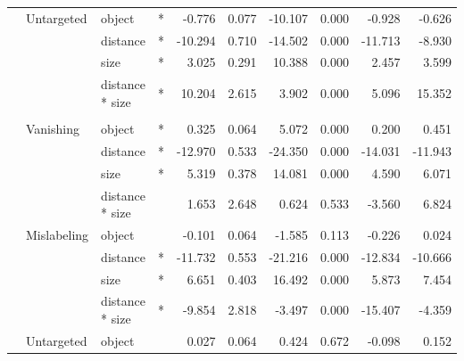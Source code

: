 \begin{longtable}[t]{llllrrrrrr}
\cmidrule{2-10}\nopagebreak
\hspace{1em} & Untargeted & object & * & -0.776 & 0.077 & -10.107 & 0.000 & -0.928 & -0.626\\
\cmidrule{3-10}\nopagebreak
\hspace{1em} &  & distance & * & -10.294 & 0.710 & -14.502 & 0.000 & -11.713 & -8.930\\
\cmidrule{3-10}\nopagebreak
\hspace{1em} &  & size & * & 3.025 & 0.291 & 10.388 & 0.000 & 2.457 & 3.599\\
\cmidrule{3-10}\nopagebreak
\hspace{1em} &  & distance * size & * & 10.204 & 2.615 & 3.902 & 0.000 & 5.096 & 15.352\\
\cmidrule{1-10}\pagebreak[0]
\addlinespace[0.3em]
\multicolumn{10}{l}{\textbf{SSD}}\\
\hspace{1em} & Vanishing & object & * & 0.325 & 0.064 & 5.072 & 0.000 & 0.200 & 0.451\\
\cmidrule{3-10}\nopagebreak
\hspace{1em} &  & distance & * & -12.970 & 0.533 & -24.350 & 0.000 & -14.031 & -11.943\\
\cmidrule{3-10}\nopagebreak
\hspace{1em} &  & size & * & 5.319 & 0.378 & 14.081 & 0.000 & 4.590 & 6.071\\
\cmidrule{3-10}\nopagebreak
\hspace{1em} &  & distance * size &  & 1.653 & 2.648 & 0.624 & 0.533 & -3.560 & 6.824\\
\cmidrule{2-10}\nopagebreak
\hspace{1em} & Mislabeling & object &  & -0.101 & 0.064 & -1.585 & 0.113 & -0.226 & 0.024\\
\cmidrule{3-10}\nopagebreak
\hspace{1em} &  & distance & * & -11.732 & 0.553 & -21.216 & 0.000 & -12.834 & -10.666\\
\cmidrule{3-10}\nopagebreak
\hspace{1em} &  & size & * & 6.651 & 0.403 & 16.492 & 0.000 & 5.873 & 7.454\\
\cmidrule{3-10}\nopagebreak
\hspace{1em} &  & distance * size & * & -9.854 & 2.818 & -3.497 & 0.000 & -15.407 & -4.359\\
\cmidrule{2-10}\nopagebreak
\hspace{1em} & Untargeted & object &  & 0.027 & 0.064 & 0.424 & 0.672 & -0.098 & 0.152\\

\end{longtable}
